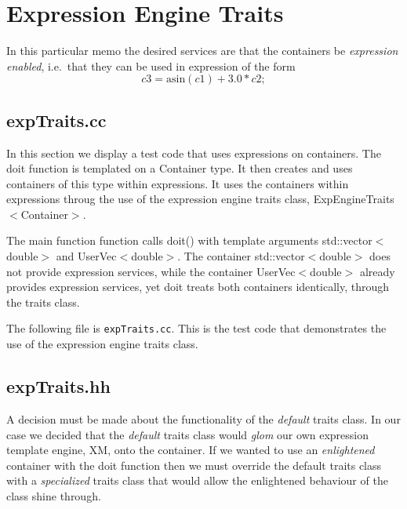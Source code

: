 \documentclass[11pt]{nmemo}
\newcommand{\cxxcode}{\color{codecolor}}
\newcommand{\code}[1]{\textcolor{codecolor}{#1}}
\newcommand{\tmpl}[1]{$<$#1$>$}
\begin{document}
\section{Expression Engine Traits}

In this particular memo the desired services are that the containers
be {\em expression enabled}, i.e.\ that they can be used in expression of the
form
\begin{equation}
  \label{eq:expression}
  c3 = \mbox{asin}(c1) + 3.0*c2;
\end{equation}

\subsection{expTraits.cc}

In this section we display a test code that uses expressions
on containers.
The \code{doit} function is templated on a
\code{Container} type.
It then creates and uses containers of this type within expressions.
It uses the containers within expressions throug the use of
the expression engine traits class, \code{ExpEngineTraits\tmpl{Container}}.

The \code{main} function function calls
\code{doit()} with template arguments
\code{std::vector\tmpl{double}} and \linebreak
\code{UserVec\tmpl{double}}.
The container \code{std::vector\tmpl{double}} does not provide expression
services,
while the container
\code{UserVec\tmpl{double}} already provides expression
services,
yet \code{doit} treats both containers identically, through the traits
class.

The following file is \texttt{expTraits.cc}.
This is the test code that demonstrates the use of the expression engine traits class.

\begin{ttfamily}
\begin{small}
\cxxcode

\end{small}
\end{ttfamily}

\subsection{expTraits.hh}

A decision must be made about the functionality of the \emph{default} traits
class.
In our case we decided that the \emph{default} traits class would \emph{glom}
our own expression template engine,
\code{XM}, onto the container\cite{Furnish97}.
If we wanted to use an \emph{enlightened} container with the \code{doit}
function then we must override the default traits class with a \emph{specialized}
traits class that would allow the enlightened behaviour of the class shine
through.
\end{document}
